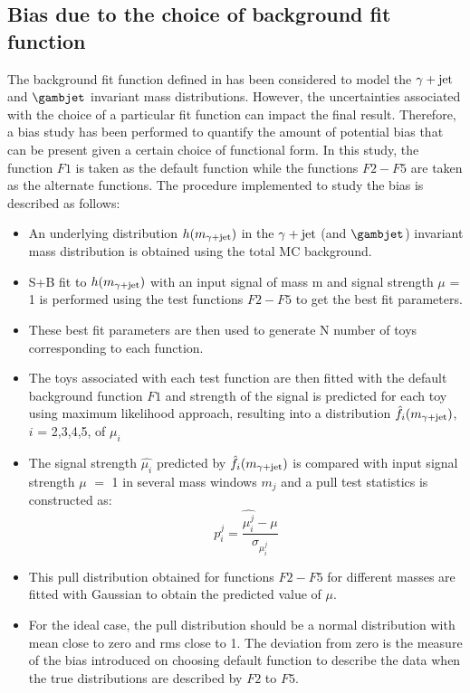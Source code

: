 \subsection{Bias due to the choice of background fit function}\label{sec:Bias}
The background fit function defined in \eqn{\ref{eq:bkgfun}} has been considered to model the $\gamma+\mathrm{jet}$ and $\gambjet$ invariant mass distributions. However,
the uncertainties associated with the choice of a particular fit function can impact the final result. Therefore, a bias study has been performed to quantify
the amount of potential bias that can be present given a certain choice of functional form. In this study, the function $F1$ is taken as the
default function while the functions $F2-F5$ are taken as the alternate functions. The procedure implemented to study the bias is described as follows:
\vspace{-0.2in}
\begin{itemize}[leftmargin=*]
\item An underlying distribution $h(m_{\gamma+\mathrm{jet}})$ in the $\gamma+\mathrm{jet}$ (and $\gambjet$) invariant mass distribution 
is obtained using the total MC background.
\item S+B fit to $h(m_{\gamma+\mathrm{jet}})$ with an input signal of mass m and signal strength $\mu$ = 1 is performed 
using the test functions $F2-F5$ to get the best fit parameters.
\item These best fit parameters are then used to generate N number of toys corresponding to each function.
\item The toys associated with each test function are then fitted with the default background function $F1$
  and strength of the signal is predicted for each toy using maximum likelihood approach, resulting into a distribution $\hat{f_{i}}(m_{\gamma+\mathrm{jet}})$, $i$ = 2,3,4,5, of
  ${\mu_{i}}$
\item The signal strength $\hat{\mu_{i}}$ predicted by $\hat{f_{i}}(m_{\gamma+\mathrm{jet}})$ is compared with input signal strength $\mu$ $=$ 1
in several mass windows $m_j$ and a pull test statistics is constructed as:
\begin{equation}
p_{i}^{j} = \frac{\hat{\mu_{i}^{j}} - \mu}{\sigma_{\mu_{i}^{j}}}
\end{equation}
\item This pull distribution obtained for functions $F2-F5$ for different masses are fitted with Gaussian to obtain the predicted value of $\mu$. 
\item For the ideal case, the pull distribution should be a normal distribution with mean close to zero and rms close to 1. The deviation from zero is
  the measure of the bias introduced on choosing default function to describe the data when the true distributions are described by $F2$ to $F5$.
\end{itemize}
\vspace{-0.2in}

